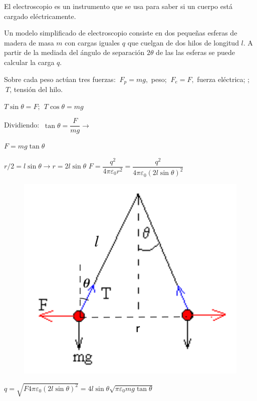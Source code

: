 \begin{prob}
El electroscopio es un instrumento que se usa para saber si un cuerpo está cargado eléctricamente.

Un modelo simplificado de electroscopio consiste en dos pequeñas esferas de madera de masa $m$ con cargas iguales $q$ que cuelgan de dos hilos de longitud $l$. A partir de la mediada del ángulo de separación $2 \theta$ de las las esferas se puede calcular la carga $q$.
\end{prob}
\begin{multicols}{2}
Sobre cada peso actúan tres fuerzas: $\ F_p=mg,$ peso; $\ F_e=F, $ fuerza eléctrica; ; $\ T$, tensión del hilo.

$T \sin\theta = F;\ \  T\cos \theta =mg$

Dividiendo: $\ \tan \theta = \dfrac F{mg} \to $

$F=mg\tan \theta$

$r/2=l\sin \theta \to r=2l\sin \theta$
$F=\dfrac{q^2}{4\pi \varepsilon_0 r^2}=\dfrac{q^2}{4\pi \varepsilon_0 (2l\sin \theta)^2}$
\begin{figure}[H]
	\centering
	\includegraphics[width=.5\textwidth]{imagenes/imagenes22/T22IM25.png}
\end{figure}	
\end{multicols}

$q=\sqrt{F4\pi \varepsilon_0 (2l\sin \theta)^2}=4l\sin \theta \sqrt{\pi \varepsilon_0 m g \tan \theta}$



